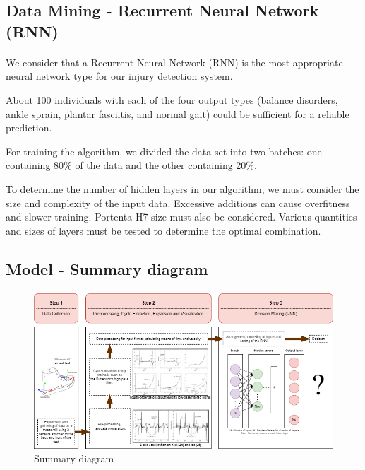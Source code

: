 \subsection{Data Mining - Recurrent Neural Network (RNN)}
\STANDARD{\insertsection}
{
\framesubtitle{\insertsubsection}
We consider that a Recurrent Neural Network (RNN) is the most appropriate neural network type for our injury detection system.

\bigskip

About 100 individuals with each of the four output types (balance disorders, ankle sprain, plantar fasciitis, and normal gait) could be sufficient for a reliable prediction.

\bigskip

For training the algorithm, we divided the data set into two batches: one containing 80\% of the data and the other containing 20\%.

\bigskip

To determine the number of hidden layers in our algorithm, we must consider the size and complexity of the input data. Excessive additions can cause overfitness and slower training. Portenta H7 size must also be considered. Various quantities and sizes of layers must be tested to determine the optimal combination.
}

\subsection{Model - Summary diagram}
\STANDARD{\insertsection}
{
\framesubtitle{\insertsubsection}
\begin{figure}[ht]
    \centering
    \includegraphics[scale=0.36]{img/Summary-diagram.png}
    \caption{Summary diagram}
    \label{fig:Summary diagram}
\end{figure}
}

